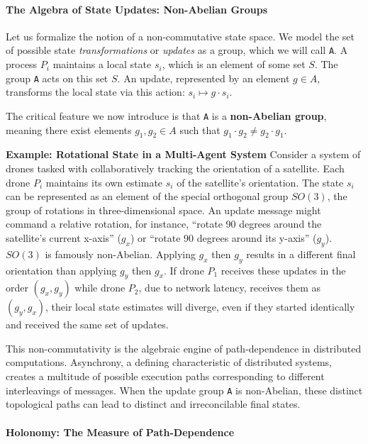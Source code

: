 \documentclass[
]{article}
\begin{document}
\paragraph{The Algebra of State Updates: Non-Abelian
Groups}\label{the-algebra-of-state-updates-non-abelian-groups}

Let us formalize the notion of a non-commutative state space. We model
the set of possible state \emph{transformations} or \emph{updates} as a
group, which we will call \texttt{A}. A process \(P_i\) maintains a
local state \(s_i\), which is an element of some set \(S\). The group
\texttt{A} acts on this set \(S\). An update, represented by an element
\(g \in A\), transforms the local state via this action:
\(s_i \mapsto g \cdot s_i\).

The critical feature we now introduce is that \texttt{A} is a
\textbf{non-Abelian group}, meaning there exist elements
\(g_1, g_2 \in A\) such that \(g_1 \cdot g_2 \neq g_2 \cdot g_1\).

\textbf{Example: Rotational State in a Multi-Agent System} Consider a
system of drones tasked with collaboratively tracking the orientation of
a satellite. Each drone \(P_i\) maintains its own estimate \(s_i\) of
the satellite's orientation. The state \(s_i\) can be represented as an
element of the special orthogonal group \(SO(3)\), the group of
rotations in three-dimensional space. An update message might command a
relative rotation, for instance, ``rotate 90 degrees around the
satellite's current x-axis'' (\(g_x\)) or ``rotate 90 degrees around its
y-axis'' (\(g_y\)). \(SO(3)\) is famously non-Abelian. Applying \(g_x\)
then \(g_y\) results in a different final orientation than applying
\(g_y\) then \(g_x\). If drone \(P_1\) receives these updates in the
order \((g_x, g_y)\) while drone \(P_2\), due to network latency,
receives them as \((g_y, g_x)\), their local state estimates will
diverge, even if they started identically and received the same set of
updates.

This non-commutativity is the algebraic engine of path-dependence in
distributed computations. Asynchrony, a defining characteristic of
distributed systems, creates a multitude of possible execution paths
corresponding to different interleavings of messages. When the update
group \texttt{A} is non-Abelian, these distinct topological paths can
lead to distinct and irreconcilable final states.

\paragraph{Holonomy: The Measure of
Path-Dependence}\label{holonomy-the-measure-of-path-dependence}
\end{document}
